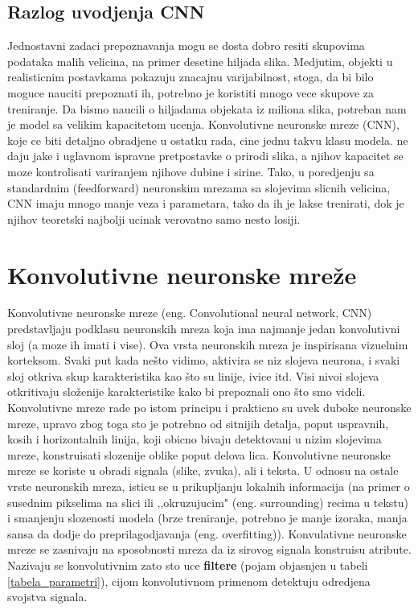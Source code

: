 \documentclass[a4paper]{article}
\begin{document}
\subsection{Razlog uvodjenja CNN}
Jednostavni zadaci prepoznavanja mogu se dosta dobro resiti skupovima podataka malih velicina, na primer desetine hiljada slika. Medjutim, objekti u realisticnim postavkama pokazuju znacajnu varijabilnost, stoga, da bi bilo moguce nauciti prepoznati ih, potrebno je koristiti mnogo vece skupove za treniranje. Da bismo naucili o hiljadama objekata iz miliona slika, potreban nam je model sa velikim kapacitetom ucenja. Konvolutivne neuronske mreze (CNN), koje ce biti detaljno obradjene u ostatku rada, cine jednu takvu klasu modela. ne daju jake i uglavnom ispravne pretpostavke o prirodi slika, a njihov kapacitet se moze kontrolisati variranjem njihove dubine i sirine. Tako, u poredjenju sa standardnim (feedforward) neuronskim mrezama sa slojevima slicnih velicina, CNN imaju mnogo manje veza i parametara, tako da ih je lakse trenirati, dok je njihov teoretski najbolji ucinak verovatno samo nesto losiji.


\section{Konvolutivne neuronske mreže}	
\label{sec:podnaslov3}


Konvolutivne neuronske mreze (eng. Convolutional neural network, CNN) predstavljaju podklasu neuronskih mreza koja ima najmanje jedan konvolutivni sloj (a moze ih imati i vise). Ova vrsta neuronskih mreza je inspirisana vizuelnim korteksom. Svaki put kada nešto vidimo, aktivira se niz slojeva neurona, i svaki sloj otkriva skup karakteristika kao što su linije, ivice itd. Visi nivoi slojeva otkritivaju složenije karakteristike kako bi prepoznali ono što smo videli. Konvolutivne mreze rade po istom principu i prakticno su uvek duboke neuronske mreze, upravo zbog toga sto je potrebno od sitnijih detalja, poput uspravnih, kosih i horizontalnih linija, koji obicno bivaju detektovani u nizim slojevima mreze, konstruisati slozenije oblike poput delova lica. Konvolutivne neuronske mreze se koriste u obradi signala (slike, zvuka), ali i teksta. U odnosu na ostale vrste neuronskih mreza, isticu se u prikupljanju lokalnih informacija (na primer o susednim pikselima na slici ili ,,okruzujucim" (eng. surrounding) recima u tekstu) i smanjenju slozenosti modela (brze treniranje, potrebno je manje izoraka, manja sansa da dodje do preprilagodjavanja (eng. overfitting)). Konvulativne neuronske mreze se zasnivaju na sposobnosti mreza da iz sirovog signala konstruisu atribute. Nazivaju se konvolutivnim zato sto uce \textbf{filtere} (pojam objasnjen u tabeli \ref{tabela_parametri}), cijom konvolutivnom primenom detektuju odredjena svojstva signala.
\end{document}
